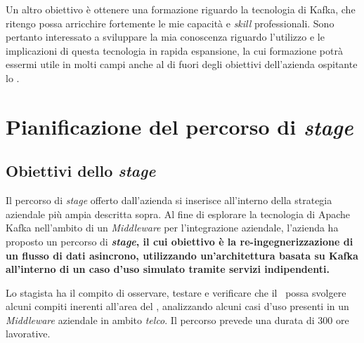 Un altro obiettivo è ottenere una formazione riguardo la tecnologia di Kafka, che ritengo possa arricchire fortemente le mie capacità e \textit{skill} professionali.
Sono pertanto interessato a sviluppare la mia conoscenza riguardo l'utilizzo e le implicazioni di questa tecnologia in rapida espansione, la cui formazione potrà essermi utile in molti campi anche al di fuori degli obiettivi dell'azienda ospitante lo \stage.


\section{Pianificazione del percorso di \textit{stage}}


%
%

\subsection{Obiettivi dello \textit{stage}}
\label{sub:obiettivi_stage}
Il percorso di \textit{stage} offerto dall'azienda si inserisce all'interno della strategia aziendale più ampia descritta sopra.
Al fine di esplorare la tecnologia di Apache Kafka nell'ambito di un \textit{Middleware} per l'integrazione aziendale, l'azienda ha proposto un percorso di \textbf{\textit{stage}, il cui obiettivo è la re-ingegnerizzazione di un flusso di dati asincrono, utilizzando un'architettura basata su Kafka all'interno di un caso d'uso simulato tramite servizi indipendenti.}

Lo stagista ha il compito di osservare, testare e verificare che il \software\ possa svolgere alcuni compiti inerenti all'area del , analizzando alcuni casi d'uso presenti in un \textit{Middleware} aziendale in ambito \textit{telco}.
Il percorso prevede una durata di 300 ore lavorative.


